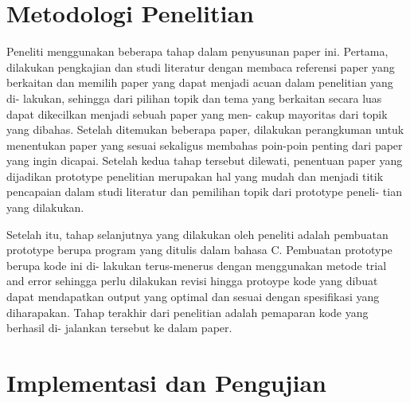 \documentclass[conference]{IEEEtran}
\begin{document}
\section{Metodologi Penelitian}
    Peneliti  menggunakan  beberapa  tahap  dalam  penyusunan
    paper  ini.  Pertama,  dilakukan  pengkajian  dan  studi  literatur
    dengan membaca referensi paper yang berkaitan dan memilih
    paper  yang  dapat  menjadi  acuan  dalam  penelitian  yang  di-
    lakukan, sehingga dari pilihan topik dan tema yang berkaitan
    secara luas dapat dikecilkan menjadi sebuah paper yang men-
    cakup  mayoritas  dari  topik  yang  dibahas.  Setelah  ditemukan
    beberapa  paper,  dilakukan  perangkuman  untuk  menentukan
    paper  yang  sesuai  sekaligus  membahas  poin-poin  penting
    dari  paper  yang  ingin  dicapai.  Setelah  kedua  tahap  tersebut
    dilewati, penentuan paper yang dijadikan prototype penelitian
    merupakan  hal  yang  mudah  dan  menjadi  titik  pencapaian
    dalam studi literatur dan pemilihan topik dari prototype peneli-
    tian yang dilakukan.\par

    Setelah  itu,  tahap  selanjutnya  yang  dilakukan  oleh  peneliti
    adalah   pembuatan   prototype   berupa   program   yang   ditulis
    dalam  bahasa  C.  Pembuatan  prototype  berupa  kode  ini  di-
    lakukan terus-menerus dengan menggunakan metode trial and
    error  sehingga  perlu  dilakukan  revisi  hingga  protoype  kode
    yang  dibuat  dapat  mendapatkan  output  yang  optimal  dan
    sesuai  dengan  spesifikasi  yang  diharapakan.  Tahap  terakhir
    dari   penelitian   adalah   pemaparan   kode   yang   berhasil   di-
    jalankan tersebut ke dalam paper.


\section{Implementasi dan Pengujian}
\end{document}
